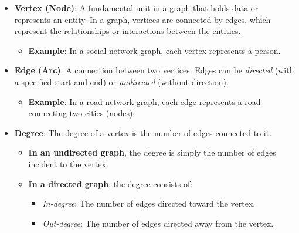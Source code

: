 \documentclass{book}
\begin{document}
\begin{itemize}
    \item \textbf{Vertex (Node)}: A fundamental unit in a graph that holds data or represents an entity. In a graph, vertices are connected by edges, which represent the relationships or interactions between the entities.
    \begin{itemize}
        \item \textbf{Example}: In a social network graph, each vertex represents a person.
    \end{itemize}
    \item \textbf{Edge (Arc)}: A connection between two vertices. Edges can be \textit{directed} (with a specified start and end) or \textit{undirected} (without direction).
    \begin{itemize}
        \item \textbf{Example}: In a road network graph, each edge represents a road connecting two cities (nodes).
    \end{itemize}
    \item \textbf{Degree}: The degree of a vertex is the number of edges connected to it. 
    \begin{itemize}
        \item \textbf{In an undirected graph}, the degree is simply the number of edges incident to the vertex.
        \item \textbf{In a directed graph}, the degree consists of:
        \begin{itemize}
            \item \textit{In-degree}: The number of edges directed toward the vertex.
            \item \textit{Out-degree}: The number of edges directed away from the vertex.
        \end{itemize}
    \end{itemize}
    

\end{itemize}
\end{document}

